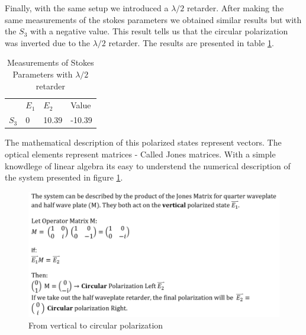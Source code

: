 Finally, with the same setup we introduced a $\lambda/2$ retarder. After making the same measurements of the stokes parameters we obtained similar results but with the $S_3$ with a negative value. This result tells us that the circular polarization was inverted due to the  $\lambda/2$ retarder. The results are presented in table \ref{Tab:Stokes2}.
\begin{table}[H]
\begin{center}
\begin{tabular}{|l|l|l|l|}
      & $E_1$ & $E_2$ & Value \\
$S_3$ & 0 & 10.39  & -10.39       
\end{tabular}
\caption{Measurements of Stokes Parameters with $\lambda/2$ retarder}
\label{Tab:Stokes2}
\end{center}
\end{table}
The mathematical description of this polarized states represent vectors. The optical elements represent matrices - Called Jones matrices. With a simple knowdlege of linear algebra its easy to understend the numerical description of the system presented in figure \ref{fig:Proof}. 
\begin{figure}[H]
    \centering
    \includegraphics[scale=0.42]{Figures/Proof.png}
    \caption{From vertical to circular polarization}
    \label{fig:Proof}
\end{figure}